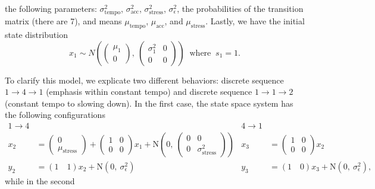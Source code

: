 \documentclass[aoas]{imsart}
\begin{document}
the following parameters: $\sigma_{\textrm{tempo}}^2$, $\sigma_{\textrm{acc}}^2$, $\sigma^2_{\textrm{stress}}$,
$\sigma_\epsilon^2$, the probabilities of the transition matrix (there
are 7), and means $\mu_{\textrm{tempo}}$, $\mu_{\textrm{acc}}$, and $\mu_{\textrm{stress}}$. Lastly, we have the initial state distribution
\[
x_1\sim N\left( \begin{pmatrix}\mu_1\\0\end{pmatrix}
  ,\ \begin{pmatrix} \sigma^2_1 & 0\\0 & 0
  \end{pmatrix}\right)\; \; \textrm{where} \; \; s_1=1.
\]

To clarify this model, we explicate two different behaviors: discrete
sequence $1\rightarrow 4\rightarrow 1$ (emphasis within constant tempo) and discrete sequence
$1\rightarrow 1\rightarrow 2$ (constant tempo to slowing down). In the
first case, the state space system has the following configurations
{\footnotesize
\begin{align*}
  1\rightarrow 4 && 4\rightarrow 1\\
  x_{2} &= \begin{pmatrix} 0\\ \mu_{\textrm{stress}} \end{pmatrix}
  + \begin{pmatrix}1&0\\0&0\end{pmatrix} x_{1} +
                           \mbox{N}\left(0,\ \begin{pmatrix}0&0\\0&\sigma_{\textrm{stress}}^2\end{pmatrix}\right)
        &   x_{3}
                    &= 
  \begin{pmatrix}1&0\\0&0\end{pmatrix} x_{2} \\
  y_2 &= (1\quad  1)  x_2 + \mbox{N}(0,\
                                 \sigma_\epsilon^2) &
y_3 &= (1\quad  0) x_3 + \mbox{N}(0,\
                                 \sigma_\epsilon^2),
\end{align*}
}%
while in the second
\end{document}
